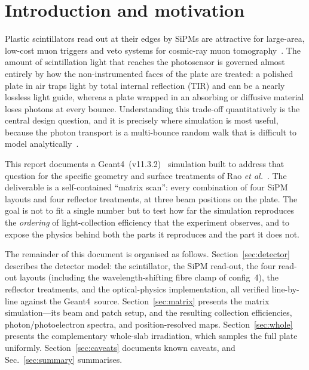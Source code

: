 \documentclass[11pt,a4paper]{article}
\newcommand{\gfour}{Geant4}
\begin{document}
\section{Introduction and motivation}

Plastic scintillators read out at their edges by SiPMs are attractive for
large-area, low-cost muon triggers and veto systems for cosmic-ray muon
tomography~\cite{Borozdin2003,Bonechi2020}. The amount of scintillation
light that reaches the photosensor is governed almost entirely by how the
non-instrumented faces of the plate are treated: a polished plate in air traps
light by total internal reflection (TIR) and can be a nearly lossless light
guide, whereas a plate wrapped in an absorbing or diffusive material loses
photons at every bounce. Understanding this trade-off quantitatively is the
central design question, and it is precisely where simulation is most useful,
because the photon transport is a multi-bounce random walk that is difficult to
model analytically~\cite{Korpachev2017}.

This report documents a \gfour\ (v11.3.2)~\cite{Agostinelli2003,Allison2016}
simulation built to address that
question for the specific geometry and surface treatments of Rao \emph{et
al.}~\cite{Rao2025}. The deliverable is a self-contained ``matrix scan'': every
combination of four SiPM layouts and four reflector treatments, at three beam
positions on the plate. The goal is not to fit a single number but to test how
far the simulation reproduces the \emph{ordering} of light-collection efficiency
that the experiment observes, and to expose the physics behind both the parts it
reproduces and the part it does not.

The remainder of this document is organised as follows.
Section~\ref{sec:detector} describes the detector model: the scintillator, the
SiPM read-out, the four read-out layouts (including the wavelength-shifting
fibre clamp of config~4), the reflector treatments, and the optical-physics
implementation, all verified line-by-line against the \gfour\ source.
Section~\ref{sec:matrix} presents the matrix simulation---its beam and patch
setup, and the resulting collection efficiencies, photon/photoelectron spectra,
and position-resolved maps.
Section~\ref{sec:whole} presents the complementary whole-slab irradiation, which
samples the full plate uniformly.
Section~\ref{sec:caveats} documents known caveats, and
Sec.~\ref{sec:summary} summarises.

\end{document}
